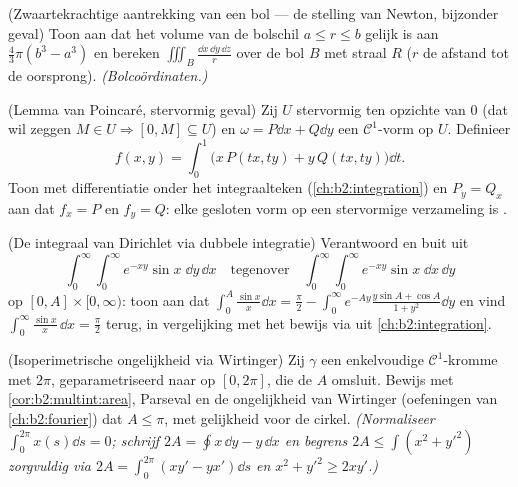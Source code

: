 \begin{exercise}[$\star\star$]\label{exo:b2:multint:7}
(Zwaartekrachtige aantrekking van een bol --- de stelling van
Newton, bijzonder geval) Toon aan dat het volume van de bolschil $a
\leq r \leq b$ gelijk is aan $\frac43\pi(b^3 - a^3)$ en bereken
$\iiint_{B} \frac{\dd x\,\dd y\,\dd z}{r}$ over de bol $B$ met
straal $R$ ($r$ de afstand tot de oorsprong). \emph{(Bolcoördinaten.)}
\end{exercise}

\begin{exercise}[$\star\star\star$]\label{exo:b2:multint:8}
(Lemma van Poincaré, stervormig geval) Zij $U$ stervormig ten
opzichte van $0$ (dat wil zeggen $M \in U \Rightarrow [0, M]
\subseteq U$) en $\omega = P\dd x + Q\dd y$ een 
$\mathcal{C}^1$-vorm op $U$. Definieer
\[
f(x, y) = \int_0^1 \bigl(x\,P(tx, ty) + y\,Q(tx, ty)\bigr)\dd t .
\]
Toon met differentiatie onder het integraalteken
(\cref{ch:b2:integration}) en $P_y = Q_x$ aan dat $f_x = P$ en $f_y
= Q$: elke gesloten vorm op een stervormige  verzameling is
.
\end{exercise}

\begin{exercise}[$\star\star\star$]\label{exo:b2:multint:9}
(De integraal van Dirichlet via dubbele integratie) Verantwoord en
buit uit
\[
\int_0^\infty\!\!\int_0^\infty e^{-xy}\sin x\;\dd y\,\dd x
\quad\text{tegenover}\quad
\int_0^\infty\!\!\int_0^\infty e^{-xy}\sin x\;\dd x\,\dd y
\]
op $[0, A] \times [0, \infty)$: toon aan dat $\int_0^A \frac{\sin
x}{x}\dd x = \frac\pi2 - \int_0^\infty e^{-Ay}\frac{y\sin A +
\cos A}{1 + y^2}\dd y$ en vind $\int_0^\infty \frac{\sin x}{x}\,\dd
x = \frac\pi2$ terug, in vergelijking met het bewijs via
 uit \cref{ch:b2:integration}.
\end{exercise}

\begin{exercise}[$\star\star\star$]\label{exo:b2:multint:10}
(Isoperimetrische ongelijkheid via Wirtinger) Zij $\gamma$ een
enkelvoudige  $\mathcal{C}^1$-kromme met  $2\pi$,
geparametriseerd naar  op $[0, 2\pi]$, die de 
$A$ omsluit. Bewijs met \cref{cor:b2:multint:area}, Parseval en de
ongelijkheid van Wirtinger (oefeningen van \cref{ch:b2:fourier})
dat $A \leq \pi$, met gelijkheid voor de cirkel. \emph{(Normaliseer
$\int_0^{2\pi} x(s)\dd s = 0$; schrijf $2A = \oint x\,\dd y - y\,\dd
x$ en begrens $2A \leq \int (x^2 + y'^2)$ zorgvuldig via $2A =
\int_0^{2\pi}(xy' - yx')\dd s$ en $x^2 + y'^2 \geq 2xy'$.)}
\end{exercise}

